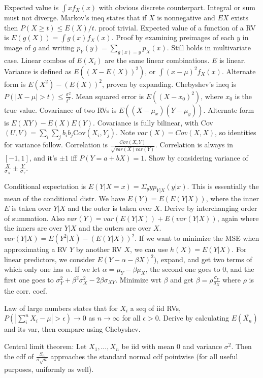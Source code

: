 \documentclass{article}
\newcommand{\conj}{\overline}
\begin{document}
Expected value is $\int xf_X(x)$ with obvious discrete counterpart. Integral or sum must not diverge. Markov's ineq states that if $X$ is nonnegative and $EX$ exists then $P(X\geq t)\leq E(X)/t$. proof trivial. Expected value of a function of a RV is $E(g(X))=\int g(x)f_X(x)$. Proof by examining preimages of each $y$ in image of $g$ and writing $p_Y(y)=\sum_{g(x)=y}p_X(x)$. Still holds in multivariate case. Linear combos of $E(X_i)$ 
are the same linear combinations. $E$ is linear. Variance is defined as $E((X-E(X))^2)$, or $\int(x-\mu)^2f_X(x)$. Alternate form is $E(X^2)-(E(X))^2$, proven by expanding. Chebyshev's ineq is $P(|X-\mu|>t)\leq\frac{\sigma^2}{t^2}$. Mean squared error is $E((X-x_0)^2)$, where $x_0$ is the true value. Covariance of two RVs is $E((X-\mu_x)(Y-\mu_y))$. Alternate form is $E(XY)-E(X)E(Y)$. 
Covariance is fully bilinear, with Cov$(U,V)=\sum_i\sum_jb_ib_j\text{Cov}(X_i,Y_j)$. Note $var(X)=Cov(X,X)$, so identities for variance follow. Correlation is $\frac{Cov(X,Y)}{\sqrt{var(X)var(Y)}}$. Correlation is always in $[-1,1]$, and it's $\pm1$ iff $P(Y=a+bX)=1$. Show by considering variance of $\frac{X}{\sigma_X}\pm\frac{Y}{\sigma_Y}$.

Conditional expectation is $E(Y|X=x)=\Sigma_yyp_{Y|X}(y|x)$. This is essentially the mean of the conditional distr. We have $E(Y)=E(E(Y|X))$, where the inner $E$ is taken over $Y|X$ and the outer is taken over $X$. Derive by interchanging order of summation. Also $var(Y)=var(E(Y|X))+E(var(Y|X))$, again where the inners are over $Y|X$ and the outers are over $X$. $var(Y|X)=E(Y^2|X)-(E(Y|X))^2$. 
If we want to minimize the MSE when approximating a RV $Y$ by another RV $X$, we can use $h(X)=E(Y|X)$. For linear predictors, we consider $E(Y-\alpha-\beta X)^2)$, expand, and get two terms of which only one has $\alpha$. If we let $\alpha=\mu_Y-\beta\mu_X$, the second one goes to $0$, and the first one goes to $\sigma_Y^2+\beta^2\sigma_X^2-2\beta\sigma_{XY}$. Minimize wrt $\beta$ and get $\beta=\rho\frac{\sigma_Y}{\sigma_X}$ where $\rho$ is the corr. coef.

Law of large numbers states that for $X_i$ a seq of iid RVs, $P(|\sum_i^nX_i-\mu|>\epsilon)\to0$ as $n\to\infty$ for all $\epsilon>0$. Derive by calculating $E(\conj{X_n})$ and its var, then compare using Chebyshev.

Central limit theorem: Let $X_1,\ldots,X_n$ be iid with mean $0$ and variance $\sigma^2$. Then the cdf of $\frac{S_n}{\sigma\sqrt{n}}$ approaches the standard normal cdf pointwise (for all useful purposes, uniformly as well).
\end{document}
